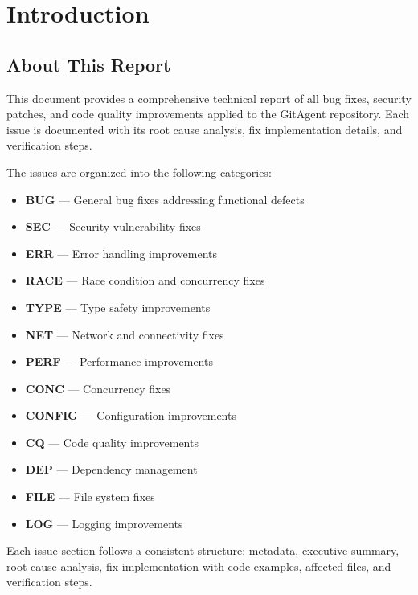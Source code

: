 \chapter*{Introduction}

\section*{About This Report}

This document provides a comprehensive technical report of all bug fixes, security patches, and code quality improvements applied to the GitAgent repository. Each issue is documented with its root cause analysis, fix implementation details, and verification steps.

The issues are organized into the following categories:

\begin{itemize}
    \item \textbf{BUG} --- General bug fixes addressing functional defects
    \item \textbf{SEC} --- Security vulnerability fixes
    \item \textbf{ERR} --- Error handling improvements
    \item \textbf{RACE} --- Race condition and concurrency fixes
    \item \textbf{TYPE} --- Type safety improvements
    \item \textbf{NET} --- Network and connectivity fixes
    \item \textbf{PERF} --- Performance improvements
    \item \textbf{CONC} --- Concurrency fixes
    \item \textbf{CONFIG} --- Configuration improvements
    \item \textbf{CQ} --- Code quality improvements
    \item \textbf{DEP} --- Dependency management
    \item \textbf{FILE} --- File system fixes
    \item \textbf{LOG} --- Logging improvements
\end{itemize}

Each issue section follows a consistent structure: metadata, executive summary, root cause analysis, fix implementation with code examples, affected files, and verification steps.


